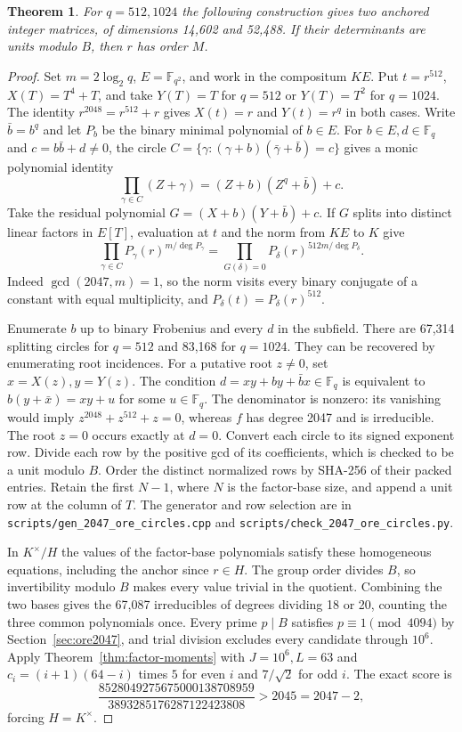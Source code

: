 \documentclass[11pt]{article}
\newtheorem{theorem}{Theorem}
\begin{document}
\begin{theorem}\label{thm:2047-circle-criterion}
For \(q=512,1024\) the following construction gives two anchored integer
matrices, of dimensions 14,602 and 52,488. If their determinants are
units modulo \(B\), then \(r\) has order \(M\).
\end{theorem}
\begin{proof}
Set \(m=2\log_2 q\), \(E=\mathbb F_{q^2}\), and work in the compositum
\(KE\). Put \(t=r^{512}\), \(X(T)=T^4+T\), and take \(Y(T)=T\)
for \(q=512\) or \(Y(T)=T^2\) for \(q=1024\).
The identity \(r^{2048}=r^{512}+r\) gives \(X(t)=r\) and
\(Y(t)=r^q\) in both cases. Write \(\bar b=b^q\) and let \(P_b\)
be the binary minimal polynomial of \(b\in E\).
For \(b\in E,d\in\mathbb F_q\) and \(c=b\bar b+d\ne0\), the circle
\(C=\{\gamma:(\gamma+b)(\bar\gamma+\bar b)=c\}\)
gives a monic polynomial identity
\[
  \prod_{\gamma\in C}(Z+\gamma)=(Z+b)(Z^q+\bar b)+c.
\]
Take the residual polynomial \(G=(X+b)(Y+\bar b)+c\).
If \(G\) splits into distinct linear factors in \(E[T]\), evaluation at
\(t\) and the norm from \(KE\) to \(K\) give
\[
 \prod_{\gamma\in C}P_\gamma(r)^{m/\deg P_\gamma}
   =\prod_{G(\delta)=0}P_\delta(r)^{512m/\deg P_\delta}.
\]
Indeed \(\gcd(2047,m)=1\), so the norm visits every binary conjugate
of a constant with equal multiplicity, and
\(P_\delta(t)=P_\delta(r)^{512}\).

Enumerate \(b\) up to binary Frobenius and every \(d\) in the subfield.
There are 67,314 splitting circles for \(q=512\) and 83,168 for
\(q=1024\). They can be recovered by enumerating root incidences.
For a putative root \(z\ne0\), set \(x=X(z),y=Y(z)\).
The condition \(d=xy+by+\bar b x\in\mathbb F_q\) is equivalent to
\(b(y+\bar x)=xy+u\) for some \(u\in\mathbb F_q\).
The denominator is nonzero: its vanishing would imply
\(z^{2048}+z^{512}+z=0\), whereas \(f\) has degree 2047 and is
irreducible. The root \(z=0\) occurs exactly at \(d=0\).
Convert each circle to its signed exponent row. Divide each row by
the positive gcd of its coefficients, which is checked to be a unit
modulo \(B\). Order the distinct normalized rows by SHA-256 of their
packed entries. Retain the first \(N-1\), where \(N\) is the factor-base
size, and append a unit row at the column of \(T\).
The generator and row selection are in
\nolinkurl{scripts/gen_2047_ore_circles.cpp} and
\nolinkurl{scripts/check_2047_ore_circles.py}.

In \(K^\times/H\) the values of the factor-base polynomials satisfy
these homogeneous equations, including the anchor since \(r\in H\).
The group order divides \(B\), so invertibility modulo \(B\) makes
every value trivial in the quotient. Combining the two bases gives
the 67,087 irreducibles of degrees dividing 18 or 20, counting the
three common polynomials once. Every prime \(p\mid B\) satisfies
\(p\equiv1\pmod{4094}\) by Section~\ref{sec:ore2047}, and trial
division excludes every candidate through \(10^6\).
Apply Theorem~\ref{thm:factor-moments} with \(J=10^6,L=63\) and
\(c_i=(i+1)(64-i)\) times \(5\) for even \(i\) and \(7/\sqrt2\)
for odd \(i\). The exact score is
\[
 \frac{8528049275675000138708959}{3893285176287122423808}
   >2045=2047-2,
\]
forcing \(H=K^\times\).
\end{proof}
\end{document}
